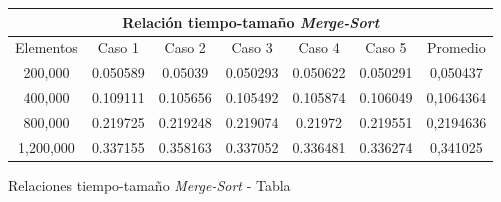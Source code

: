 \documentclass[twocolumn,english,journal]{IEEEtran}
\begin{document}
\begin{figure}[h]
\caption{Relaciones tiempo-tamaño \emph{Merge-Sort} - Tabla \label{Tabla-Merge}}
\begin{tabular}{| c | c | c | c | c | c | c |}
\hline
\multicolumn{7}{|c|}{Relación tiempo-tamaño \emph{Merge-Sort}} \\
\hline
\hline
Elementos & Caso 1 & Caso 2 & Caso 3 & Caso 4 & Caso 5 & Promedio \\
200,000 & 0.050589 & 0.05039 & 0.050293 & 0.050622 & 0.050291 & 0,050437\\
400,000 & 0.109111 & 0.105656 & 0.105492 & 0.105874 & 0.106049 & 0,1064364\\
800,000 & 0.219725 & 0.219248 & 0.219074 & 0.21972 & 0.219551 & 0,2194636\\
1,200,000 & 0.337155 & 0.358163 & 0.337052 & 0.336481 & 0.336274 & 0,341025\\
\hline
\end{tabular}
\end{figure}
\end{document}
